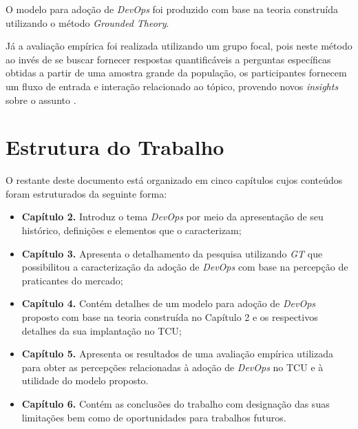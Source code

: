 O modelo para adoção de \textit{DevOps} foi produzido com base na teoria
construída utilizando o método \textit{Grounded Theory}.

Já a avaliação empírica foi realizada utilizando um grupo focal, pois neste método
ao invés de se buscar fornecer respostas quantificáveis a perguntas específicas
obtidas a partir de uma amostra grande da população, os participantes fornecem
um fluxo de entrada e interação relacionado ao tópico, provendo novos
\textit{insights} sobre o assunto \cite{focus_group_handbook}.

\section{Estrutura do Trabalho}

O restante deste documento está organizado em cinco capítulos cujos conteúdos
foram estruturados da seguinte forma:

\begin{itemize}
\item \textbf{Capítulo 2.} Introduz o tema \textit{DevOps} por meio da
apresentação de seu histórico, definições e elementos que o caracterizam;
\item \textbf{Capítulo 3.} Apresenta o detalhamento da pesquisa utilizando
\textit{\acrfull{GT}} que possibilitou a caracterização da adoção de
\textit{DevOps} com base na percepção de praticantes do mercado;
\item \textbf{Capítulo 4.} Contém detalhes de um modelo para adoção de
\textit{DevOps} proposto com base na teoria construída no Capítulo 2 e os
respectivos detalhes da sua implantação no \acrshort{TCU};
\item \textbf{Capítulo 5.} Apresenta os resultados de uma avaliação empírica
utilizada para obter as percepções relacionadas à adoção de \textit{DevOps} no
\acrshort{TCU} e à utilidade do modelo proposto.
\item \textbf{Capítulo 6.} Contém as conclusões do trabalho com designação
das suas limitações bem como de oportunidades para trabalhos futuros.
\end{itemize}




